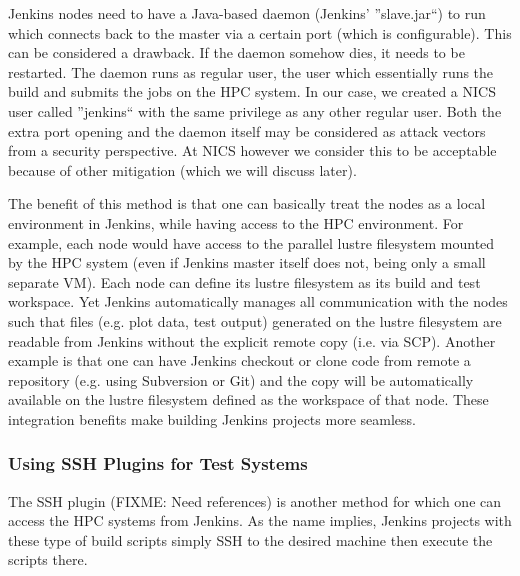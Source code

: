\documentclass[10pt, conference, compsocconf]{IEEEtran}
\begin{document}
Jenkins nodes need to have a Java-based daemon (Jenkins' ''slave.jar``) to run which connects back to the master via a certain port (which is configurable). 
This can be considered a drawback. 
If the daemon somehow dies, it needs to be restarted. 
The daemon runs as regular user, the user which essentially runs the build and submits the jobs on the HPC system. 
In our case, we created a NICS user called ''jenkins`` with the same privilege as any other regular user. 
Both the extra port opening and the daemon itself may be considered as attack vectors from a security perspective. 
At NICS however we consider this to be acceptable because of other mitigation (which we will discuss later).

The benefit of this method is that one can basically treat the nodes as a local environment in Jenkins, while having access to the HPC environment. 
For example, each node would have access to the parallel lustre filesystem mounted by the HPC system (even if Jenkins master itself does not, being only a small separate VM). 
Each node can define its lustre filesystem as its build and test workspace. 
Yet Jenkins automatically manages all communication with the nodes such that files (e.g. plot data, test output) generated on the lustre filesystem are readable from Jenkins without the explicit remote copy (i.e. via SCP). 
Another example is that one can have Jenkins checkout or clone code from remote a repository (e.g. using Subversion or Git) and the copy will be automatically available on the lustre filesystem defined as the workspace of that node. 
These integration benefits make building Jenkins projects more seamless.

\subsubsection{Using SSH Plugins for Test Systems}
The SSH plugin (FIXME: Need references) is another method for which one can access the HPC systems from Jenkins. 
As the name implies, Jenkins projects with these type of build scripts simply SSH to the desired machine then execute the scripts there. 
\end{document}
